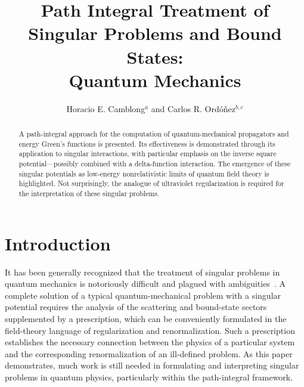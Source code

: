 \documentclass[a4paper,preprint,draft,showpacs,amsmath,amsfonts,amssymb,aps,prd]{revtex4}%
\begin{document}
\title{Path Integral Treatment of 
 Singular Problems and Bound States:
\\
Quantum Mechanics}
                                                                               
\author{
Horacio E. Camblong$^{a}$
and
Carlos R. Ord\'{o}\~{n}ez$^{b,c}$}



\begin{abstract}
A path-integral approach for the computation of quantum-mechanical 
propagators and energy Green's functions is presented.
Its effectiveness is demonstrated through its application to singular interactions, with particular 
emphasis on the inverse square potential---possibly combined with a delta-function interaction.
The emergence of these singular potentials as low-energy nonrelativistic limits of
quantum field theory is highlighted.
Not surprisingly, the analogue of ultraviolet regularization is required
for the interpretation of these singular problems.
\end{abstract}


\maketitle



\section{Introduction}
\label{sec:introduction}


It has been generally recognized
that the treatment of singular problems in quantum mechanics is 
notoriously difficult and plagued with ambiguities~\cite{fra:71}.
A complete solution of a typical quantum-mechanical problem with a singular potential requires 
the analysis of the scattering and bound-state sectors supplemented by
a prescription, which can be conveniently formulated in the field-theory language 
of regularization and renormalization. 
Such a prescription
establishes the necessary connection between the physics of
a particular system and the corresponding renormalization of an ill-defined problem.
As this paper demonstrates,
much work is still needed in formulating and interpreting
singular problems in quantum physics,
 particularly within the path-integral framework.
\end{document}
